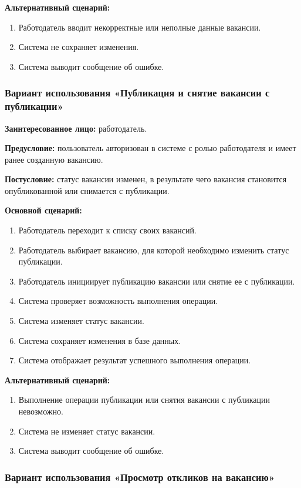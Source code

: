 \textbf{Альтернативный сценарий:}
\begin{enumerate}
	\item Работодатель вводит некорректные или неполные данные вакансии.
	\item Система не сохраняет изменения.
	\item Система выводит сообщение об ошибке.
\end{enumerate}

\subsubsection{Вариант использования «Публикация и снятие вакансии с публикации»}

\textbf{Заинтересованное лицо:} работодатель.

\textbf{Предусловие:} пользователь авторизован в системе с ролью работодателя и имеет ранее созданную вакансию.

\textbf{Постусловие:} статус вакансии изменен, в результате чего вакансия становится опубликованной или снимается с публикации.

\textbf{Основной сценарий:}
\begin{enumerate}
	\item Работодатель переходит к списку своих вакансий.
	\item Работодатель выбирает вакансию, для которой необходимо изменить статус публикации.
	\item Работодатель инициирует публикацию вакансии или снятие ее с публикации.
	\item Система проверяет возможность выполнения операции.
	\item Система изменяет статус вакансии.
	\item Система сохраняет изменения в базе данных.
	\item Система отображает результат успешного выполнения операции.
\end{enumerate}

\textbf{Альтернативный сценарий:}
\begin{enumerate}
	\item Выполнение операции публикации или снятия вакансии с публикации невозможно.
	\item Система не изменяет статус вакансии.
	\item Система выводит сообщение об ошибке.
\end{enumerate}

\subsubsection{Вариант использования «Просмотр откликов на вакансию»}

